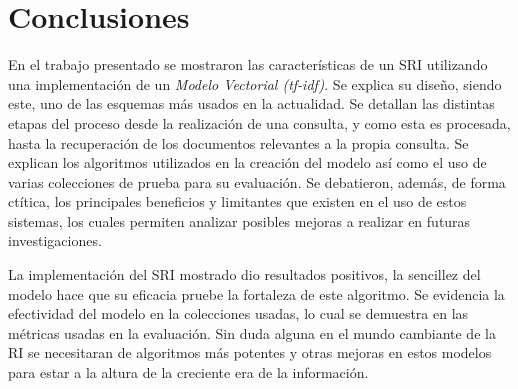 \section{Conclusiones}\label{sec:conc}

En el trabajo presentado se mostraron las características de un SRI utilizando
una implementación de un \emph{Modelo Vectorial (tf-idf)}. Se explica su
diseño, siendo este, uno de las esquemas más usados en la actualidad. Se
detallan las distintas etapas del proceso desde la realización de una consulta,
y como esta es procesada, hasta la recuperación de los documentos relevantes a
la propia consulta. Se explican los algoritmos utilizados en la creación del
modelo así como el uso de varias colecciones de prueba para su evaluación.
Se debatieron, además, de forma ctítica, los principales beneficios y
limitantes que existen en el uso de estos sistemas, los cuales permiten
analizar posibles mejoras a realizar en futuras investigaciones.

La implementación del SRI mostrado dio resultados positivos, la sencillez del
modelo hace que su eficacia pruebe la fortaleza de este algoritmo. Se
evidencia la efectividad del modelo en la colecciones usadas, lo cual se
demuestra en las métricas usadas en la evaluación. Sin duda alguna en
el mundo cambiante de la RI se necesitaran de algoritmos más potentes y otras
mejoras en estos modelos para estar a la altura de la creciente era de la
información.
